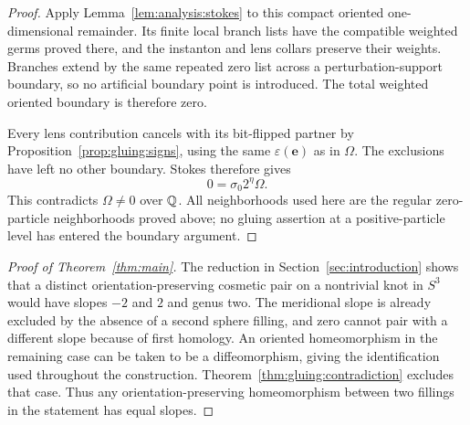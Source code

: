 \begin{proof}
Apply Lemma~\ref{lem:analysis:stokes} to this compact oriented
one-dimensional remainder.  Its finite local branch lists have the
compatible weighted germs proved there, and the instanton and lens
collars preserve their weights.  Branches extend by the same repeated
zero list across a perturbation-support boundary, so no artificial
boundary point is introduced.  The total weighted oriented boundary
is therefore zero.

Every lens contribution cancels with its bit-flipped partner
by Proposition~\ref{prop:gluing:signs}, using the same
$\varepsilon(\mathbf e)$ as in $\Omega$.  The exclusions have
left no other boundary.  Stokes therefore gives
\[
 0=\sigma_0 2^\eta\Omega.
\]
This contradicts $\Omega\ne0$ over $\mathbb Q$.  All neighborhoods
used here are the regular zero-particle neighborhoods proved
above; no gluing assertion at a positive-particle level has
entered the boundary argument.
\end{proof}

\begin{proof}[Proof of Theorem~\ref{thm:main}]
The reduction in Section~\ref{sec:introduction} shows that a
distinct orientation-preserving cosmetic pair on a nontrivial
knot in $S^3$ would have slopes $-2$ and $2$ and genus two.
The meridional slope is already excluded by the absence of a
second sphere filling, and zero cannot pair with a different
slope because of first homology.  An oriented homeomorphism
in the remaining case can be taken to be a diffeomorphism,
giving the identification used throughout the construction.
Theorem~\ref{thm:gluing:contradiction} excludes that case.
Thus any orientation-preserving homeomorphism between two
fillings in the statement has equal slopes.
\end{proof}
